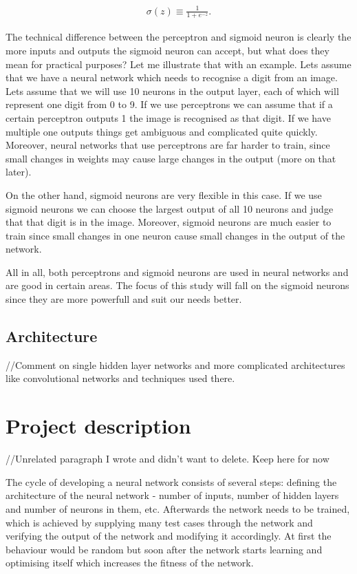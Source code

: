\documentclass{l4proj}
\begin{document}
\begin{eqnarray} 
  \sigma(z) \equiv \frac{1}{1+e^{-z}}.
\end{eqnarray}

The technical difference between the perceptron and sigmoid neuron is clearly the more inputs and outputs the sigmoid neuron can accept, but what does they mean for practical purposes? Let me illustrate that with an example. Lets assume that we have a neural network which needs to recognise a digit from an image. Lets assume that we will use 10 neurons in the output layer, each of which will represent one digit from 0 to 9. If we use perceptrons we can assume that if a certain perceptron outputs 1 the image is recognised as that digit. If we have multiple one outputs things get ambiguous and complicated quite quickly. Moreover, neural networks that use perceptrons are far harder to train, since small changes in weights may cause large changes in the output (more on that later).

On the other hand, sigmoid neurons are very flexible in this case. If we use sigmoid neurons we can choose the largest output of all 10 neurons and judge that that digit is in the image. Moreover, sigmoid neurons are much easier to train since small changes in one neuron cause small changes in the output of the network.

All in all, both perceptrons and sigmoid neurons are used in neural networks and are good in certain areas. The focus of this study will fall on the sigmoid neurons since they are more powerfull and suit our needs better.

\subsection{Architecture}
//Comment on single hidden layer networks and more complicated architectures like convolutional networks and techniques used there.

\section{Project description}
//Unrelated paragraph I wrote and didn't want to delete. Keep here for now

The cycle of developing a neural network consists of several steps: defining the architecture of the neural network - number of inputs, number of hidden layers and number of neurons in them, etc. Afterwards the network needs to be trained, which is achieved by supplying many test cases through the network and verifying the output of the network and modifying it accordingly. At first the behaviour would be random but soon after the network starts learning and optimising itself which increases the fitness of the network.



\end{document}
